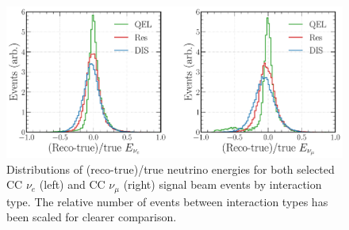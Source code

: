 \begin{figure} %
    \includegraphics[width=\textwidth]{diagrams/7-results/final_energy_frac_split.pdf}
    \caption[Distributions of (reco-true)/true neutrino energies by interaction type]
    {Distributions of (reco-true)/true neutrino energies for both selected CC $\nu_{e}$ (left) and
        CC $\nu_{\mu}$ (right) signal beam events by interaction type. The relative number of
        events between interaction types has been scaled for clearer comparison.}
    \label{fig:final_energy_frac_split}
\end{figure}

\begin{table}
    \caption[Summary of CC $\nu_{e}$ and CC $\nu_{\mu}$ FWHM values]
    {Summary of CC $\nu_{e}$ and CC $\nu_{\mu}$ neutrino energy FWHM values. Shown for each sample
        are the FWHM values for all selected signal events and the three dominant interaction type
        components, QEL, Res, and DIS. The FWHM values are calculated from the fractional energy
        difference distributions shown in  and
        , and given as a fractional percentage. The given
        errors correspond to the statistical uncertainty only.}
    \label{tab:energy_resolutions}
\end{table}

